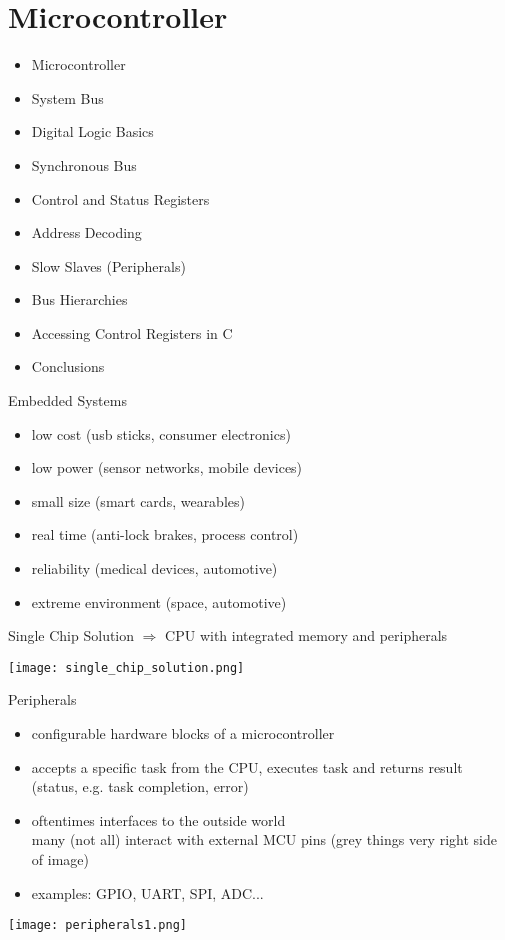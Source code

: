 \section{Microcontroller}

\begin{remark}
    \begin{itemize}
        \item Microcontroller
        \item System Bus
        \item Digital Logic Basics
        \item Synchronous Bus
        \item Control and Status Registers
        \item Address Decoding
        \item Slow Slaves (Peripherals)
        \item Bus Hierarchies
        \item Accessing Control Registers in C
        \item Conclusions
    \end{itemize}
\end{remark}

\begin{theorem}{Embedded Systems}
    \begin{itemize}
        \item low cost (usb sticks, consumer electronics)
        \item low power (sensor networks, mobile devices)
        \item small size (smart cards, wearables)
        \item real time (anti-lock brakes, process control)
        \item reliability (medical devices, automotive)
        \item extreme environment (space, automotive)
    \end{itemize}
\end{theorem}

\begin{concept}{Single Chip Solution} 
    $\Rightarrow$ CPU with integrated memory and peripherals
    
    \texttt{[image: single\_chip\_solution.png]}
\end{concept}

\begin{definition}{Peripherals}
    \begin{itemize}
        \item configurable hardware blocks of a microcontroller
        \item accepts a specific task from the CPU, executes task and returns result (status, e.g. task completion, error)
        \item oftentimes interfaces to the outside world\\
        many (not all) interact with external MCU pins (grey things very right side of image)
        \item examples: GPIO, UART, SPI, ADC...
    \end{itemize}
    \texttt{[image: peripherals1.png]}
\end{definition}

